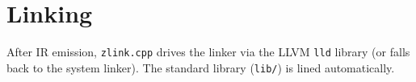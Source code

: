 \section{Linking}
After IR emission, \texttt{zlink.cpp} drives the linker via the LLVM \texttt{lld} library (or falls back to the system linker).
The standard library (\texttt{lib/}) is lined automatically.
